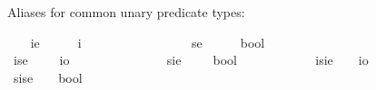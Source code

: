 \begin{isabellebody}
%
\begin{isamarkuptext}%
Aliases for common unary predicate types:%
\end{isamarkuptext}\isamarkuptrue%
\ \ \isamarkupfalse%
\ ie\ {\isacharequal}\ \ \ \ \ {\isachardoublequoteopen}{\isacharparenleft}i{\isasymRightarrow}{\isasymzero}{\isacharparenright}{\isachardoublequoteclose}\ \ \ \ \ \ \ \ \ \ \ \ \ {\isacharparenleft}{\isachardoublequoteopen}{\isasymup}{\isasymzero}{\isachardoublequoteclose}{\isacharparenright}\isanewline
\ \ \isamarkupfalse%
\ se\ {\isacharequal}\ \ \ \ \ {\isachardoublequoteopen}{\isacharparenleft}{\isasymzero}{\isasymRightarrow}bool{\isacharparenright}{\isachardoublequoteclose}\ \ \ \ \ \ \ \ \ \ {\isacharparenleft}{\isachardoublequoteopen}{\isasymlangle}{\isasymzero}{\isasymrangle}{\isachardoublequoteclose}{\isacharparenright}\isanewline
\ \ \isamarkupfalse%
\ ise\ {\isacharequal}\ \ \ \ {\isachardoublequoteopen}{\isacharparenleft}{\isasymzero}{\isasymRightarrow}io{\isacharparenright}{\isachardoublequoteclose}\ \ \ \ \ \ \ \ \ \ \ {\isacharparenleft}{\isachardoublequoteopen}{\isasymup}{\isasymlangle}{\isasymzero}{\isasymrangle}{\isachardoublequoteclose}{\isacharparenright}\isanewline
\ \ \isamarkupfalse%
\ sie\ {\isacharequal}\ \ \ \ {\isachardoublequoteopen}{\isacharparenleft}{\isasymup}{\isasymzero}{\isasymRightarrow}bool{\isacharparenright}{\isachardoublequoteclose}\ \ \ \ \ \ \ \ {\isacharparenleft}{\isachardoublequoteopen}{\isasymlangle}{\isasymup}{\isasymzero}{\isasymrangle}{\isachardoublequoteclose}{\isacharparenright}\isanewline
\ \ \isamarkupfalse%
\ isie\ {\isacharequal}\ \ \ {\isachardoublequoteopen}{\isacharparenleft}{\isasymup}{\isasymzero}{\isasymRightarrow}io{\isacharparenright}{\isachardoublequoteclose}\ \ \ \ \ \ \ \ \ {\isacharparenleft}{\isachardoublequoteopen}{\isasymup}{\isasymlangle}{\isasymup}{\isasymzero}{\isasymrangle}{\isachardoublequoteclose}{\isacharparenright}\ \ \isanewline
\ \ \isamarkupfalse%
\ sise\ {\isacharequal}\ \ \ {\isachardoublequoteopen}{\isacharparenleft}{\isasymup}{\isasymlangle}{\isasymzero}{\isasymrangle}{\isasymRightarrow}bool{\isacharparenright}{\isachardoublequoteclose}\ \ \ \ \ {\isacharparenleft}{\isachardoublequoteopen}{\isasymlangle}{\isasymup}{\isasymlangle}{\isasymzero}{\isasymrangle}{\isasymrangle}{\isachardoublequoteclose}{\isacharparenright}\isanewline

\end{isabellebody}
